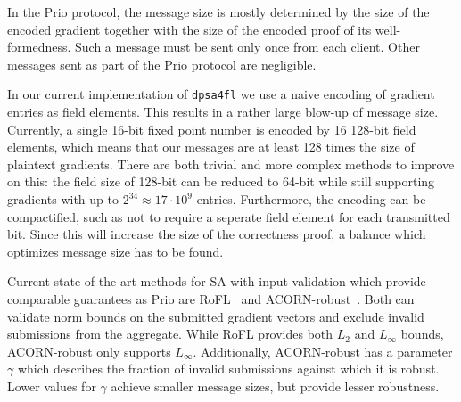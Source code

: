 \documentclass{article}
\begin{document}
In the Prio protocol, the message size is mostly determined by the size of the
encoded gradient together with the size of the encoded proof of its
well-formedness. Such a message must be sent only once from each client. Other
messages sent as part of the Prio protocol are negligible.

In our current implementation of \texttt{dpsa4fl} we use a naive encoding of
gradient entries as field elements. This results in a rather large blow-up of
message size. Currently, a single 16-bit fixed point number is encoded by 16
128-bit field elements, which means that our messages are at least 128 times
the size of plaintext gradients.
There are both trivial and more complex methods to improve on this: the field
size of 128-bit can be reduced to 64-bit while still supporting gradients with
up to $2^{34} \approx 17 \cdot 10^9$ entries. Furthermore, the encoding can be
compactified, such as not to require a seperate field element for each
transmitted bit. Since this will increase the size of the correctness proof,
a balance which optimizes message size has to be found.

Current state of the art methods for SA with input validation which provide
comparable guarantees as Prio are RoFL~\cite{rofl} and ACORN-robust~\cite{acorn}. Both
can validate norm bounds on the submitted gradient vectors and exclude invalid
submissions from the aggregate. While RoFL provides both $L_2$  and $L_\infty$
bounds, ACORN-robust only supports $L_\infty$. Additionally, ACORN-robust has a
parameter $\gamma$ which describes the fraction of invalid submissions against
which it is robust. Lower values for $\gamma$ achieve smaller message sizes, but
provide lesser robustness.
\end{document}

